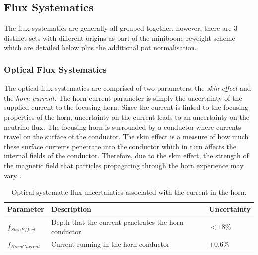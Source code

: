 \subsection{Flux Systematics}\label{sec:flux_syst}

The flux systematics are generally all grouped together, however, there are 3 distinct sets with different origins as part of the \gls{miniboone} reweight scheme which are detailed below plus the additional \gls{pot} normalisation. 

\subsubsection*{Optical Flux Systematics}
The optical flux systematics are comprised of two parameters; the \textit{skin effect} and the \textit{horn current}. The horn current parameter is simply the uncertainty of the supplied current to the focusing horn. Since the current is linked to the focusing properties of the horn, uncertainty on the current leads to an uncertainty on the neutrino flux. The focusing horn is surrounded by a conductor where currents travel on the surface of the conductor. The skin effect is a measure of how much these surface currents penetrate into the conductor which in turn affects the internal fields of the conductor. Therefore, due to the skin effect, the strength of the magnetic field that particles propagating through the horn experience may vary \cite{BNB_flux}.

\begin{table}[!h]
  \renewcommand{\arraystretch}{1.4}    
  \begin{tabular}{p{2.5cm} p{7.8cm} p{2.2cm}}

    \toprule
    Parameter & Description & Uncertainty \\ 
    \midrule

    $f_{SkinEffect}$  & Depth that the current penetrates the horn conductor & $<18 \%$\\

    $f_{HornCurrent}$ & Current running in the horn conductor & $\pm 0.6 \%$\\
    \bottomrule

  \end{tabular}
  \caption[Optical, beam focusing flux systematic parameters.]{Optical systematic flux uncertainties associated with the current in the horn\cite{BNB_flux}.}
\end{table}

\newpage
